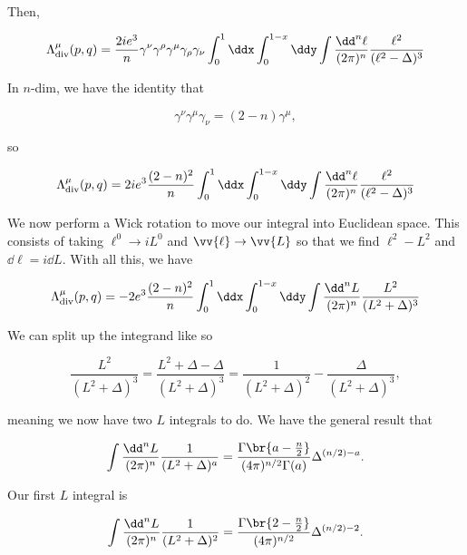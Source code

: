 \documentclass[titlepage]{article}
\begin{document}
Then,

\begin{equation}
    \Lambda^{\mu}_{\mathrm{div}}(p,q) = \frac{2ie^3}{n}\gamma^{\nu}\gamma^{\rho}\gamma^{\mu}\gamma_{\rho}\gamma_{\nu} \int_0^1\ddx \int_0^{1-x}\ddy \int \frac{\dd^n\ell}{(2\pi)^n} \frac{\ell^2}{(\ell^2 - \Delta)^3}
\end{equation}

In $n$-dim, we have the identity that

\begin{equation}
    \gamma^{\nu}\gamma^{\mu}\gamma_{\nu} = (2-n)\gamma^{\mu},
\end{equation}

so

\begin{equation}
    \Lambda^{\mu}_{\mathrm{div}}(p,q) = 2ie^3 \frac{(2-n)^2}{n} \int_0^1\ddx \int_0^{1-x}\ddy \int \frac{\dd^n\ell}{(2\pi)^n} \frac{\ell^2}{(\ell^2 - \Delta)^3}
\end{equation}

We now perform a Wick rotation to move our integral into Euclidean space. This consists of taking $\ell^0 \rightarrow iL^0$ and $\vv{\ell} \rightarrow \vv{L}$ so that we find $\ell^2 - L^2$ and $\dd\ell = i\dd L$. With all this, we have

\begin{equation}
    \Lambda^{\mu}_{\mathrm{div}}(p,q) = -2e^3 \frac{(2-n)^2}{n} \int_0^1\ddx \int_0^{1-x}\ddy \int \frac{\dd^nL}{(2\pi)^n} \frac{L^2}{(L^2 + \Delta)^3}
\end{equation}

We can split up the integrand like so

\begin{equation}
    \frac{L^2}{(L^2 + \Delta)^3} = \frac{L^2 + \Delta - \Delta}{(L^2 + \Delta)^3} = \frac{1}{(L^2 + \Delta)^2} - \frac{\Delta}{(L^2 + \Delta)^3},
\end{equation}

meaning we now have two $L$ integrals to do. We have the general result that

\begin{equation}
  \label{eq:GeneralResult}
    \int \frac{\dd^nL}{(2\pi)^n} \frac{1}{(L^2 + \Delta)^a} = \frac{\Gamma\br{a - \frac{n}{2}}}{(4\pi)^{n/2}\Gamma(a)}\Delta^{(n/2)-a}.
\end{equation}

Our first $L$ integral is

\begin{equation}
    \int \frac{\dd^nL}{(2\pi)^n} \frac{1}{(L^2 + \Delta)^2} = \frac{\Gamma\br{2 - \frac{n}{2}}}{(4\pi)^{n/2}}\Delta^{(n/2)-2}.
\end{equation}
\end{document}

